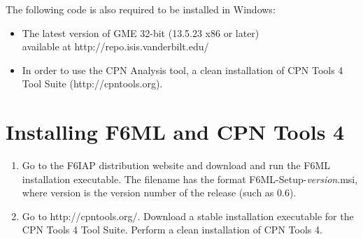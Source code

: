 The following code is also required to be installed in Windows: 
\begin{itemize}
\item The latest version of GME 32-bit (13.5.23 x86 or later) \\ available at http://repo.isis.vanderbilt.edu/
\item In order to use the CPN Analysis tool, a clean installation of CPN Tools 4 Tool Suite (http://cpntools.org).
\end{itemize}

\section{Installing F6ML and CPN Tools 4}
\begin{enumerate}
\item Go to the F6IAP distribution website and download and run the F6ML installation executable. The filename has the format F6ML-Setup-\emph{version}.msi, where version is the version number of the release (such as 0.6). 
\item Go to http://cpntools.org/. Download a stable installation executable for the CPN Tools 4 Tool Suite. Perform a clean installation of CPN Tools 4. 
\end{enumerate}

